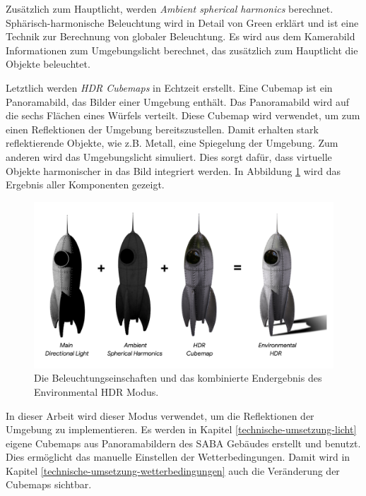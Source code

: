 Zusätzlich zum Hauptlicht, werden \textit{Ambient spherical harmonics} berechnet. Sphärisch-harmonische Beleuchtung wird in Detail von Green\cite*[]{green2003} erklärt und ist eine Technik zur Berechnung von globaler Beleuchtung. Es wird aus dem Kamerabild Informationen zum Umgebungslicht berechnet, das zusätzlich zum Hauptlicht die Objekte beleuchtet.

Letztlich werden \textit{HDR Cubemaps} in Echtzeit erstellt. Eine Cubemap ist ein Panoramabild, das Bilder einer Umgebung enthält. Das Panoramabild wird auf die sechs Flächen eines Würfels verteilt. Diese Cubemap wird verwendet, um zum einen Reflektionen der Umgebung bereitszustellen. Damit erhalten stark reflektierende Objekte, wie z.B. Metall, eine Spiegelung der Umgebung. Zum anderen wird das Umgebungslicht simuliert\cite*[Szelsiki Seite 410ff., ][]{szeliski2022}. Dies sorgt dafür, dass virtuelle Objekte harmonischer in das Bild integriert werden. In Abbildung \ref*{fig:anwendung-arcore-environmental-hdr} wird das Ergebnis aller Komponenten gezeigt.

\begin{figure}[h]
    \centering
    \includegraphics[width=\linewidth]{img/anwendung/arcore/arcore-light-estimation-environmentalhdr.png}
    \caption[Die Beleuchtungseinschaften und das kombinierte Endergebnis des Environmental HDR Modus.]{Die Beleuchtungseinschaften und das kombinierte Endergebnis des Environmental HDR Modus\protect\footnotemark.}
    \label{fig:anwendung-arcore-environmental-hdr}
\end{figure}

In dieser Arbeit wird dieser Modus verwendet, um die Reflektionen der Umgebung zu implementieren. Es werden in Kapitel \ref*{technische-umsetzung-licht} eigene Cubemaps aus Panoramabildern des SABA Gebäudes erstellt und benutzt. Dies ermöglicht das manuelle Einstellen der Wetterbedingungen. Damit wird in Kapitel \ref*{technische-umsetzung-wetterbedingungen} auch die Veränderung der Cubemaps sichtbar. 

